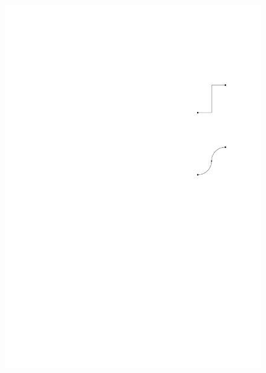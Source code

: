 \documentclass[a4paper]{scrreprt}
\theoremstyle{definition}
\begin{document}
\begin{figure}[h]
            {\includegraphics[scale=.8]{sc2_conversion/SEdge}}
        \quad

\end{figure}
\end{document}
